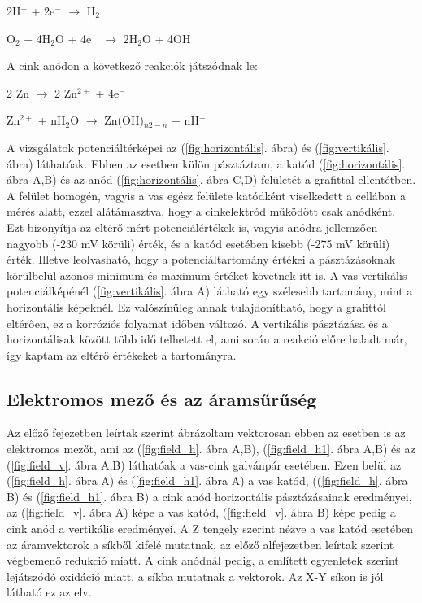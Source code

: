 2H$^+$ + 2e$^-$ $\longrightarrow$ H$_2$

O$_2$ + 4H$_2$O + 4e$^-$ $\longrightarrow$ 2H$_2$O + 4OH$^-$

A cink anódon a következő reakciók játszódnak le:

2 Zn $\longrightarrow$ 2 Zn$^{2+}$ + 4e$^-$ 

Zn$^{2+}$ + nH$_2$O $\longrightarrow$ Zn(OH)$_{n2-n}$ + nH$^+$

A vizsgálatok potenciáltérképei az (\ref{fig:horizontális}. ábra) és (\ref{fig:vertikális}. ábra) láthatóak. Ebben az esetben külön pásztáztam, a katód (\ref{fig:horizontális}. ábra A,B) és az anód (\ref{fig:horizontális}. ábra C,D) felületét a grafittal ellentétben. A felület homogén, vagyis a vas egész felülete katódként viselkedett a cellában a mérés alatt, ezzel alátámasztva, hogy a cinkelektród működött csak anódként. Ezt bizonyítja az eltérő mért potenciálértékek is, vagyis anódra jellemzően nagyobb (-230 mV körüli) érték, és a katód esetében kisebb (-275 mV körüli) érték. Illetve leolvasható, hogy a potenciáltartomány értékei a pásztázásoknak körülbelül azonos minimum és maximum értéket követnek itt is. A vas vertikális potenciálképénél (\ref{fig:vertikális}. ábra A) látható egy szélesebb tartomány, mint a horizontális képeknél. Ez valószínűleg annak tulajdonítható, hogy a grafittól eltérően, ez a korróziós folyamat időben változó. A vertikális pásztázása és a horizontálisak között több idő telhetett el, ami során a reakció előre haladt már, így kaptam az eltérő értékeket a tartományra. 

\subsection{Elektromos mező és az áramsűrűség}

Az előző fejezetben leírtak szerint ábrázoltam vektorosan ebben az esetben is az elektromos mezőt, ami az (\ref{fig:field_h}. ábra A,B), (\ref{fig:field_h1}. ábra A,B) és az (\ref{fig:field_v}. ábra A,B) láthatóak a vas-cink galvánpár esetében. Ezen belül az (\ref{fig:field_h}. ábra A) és (\ref{fig:field_h1}. ábra A) a vas katód, ((\ref{fig:field_h}. ábra B) és (\ref{fig:field_h1}. ábra B) a cink anód horizontális pásztázásainak eredményei, az (\ref{fig:field_v}. ábra A) képe a vas katód, (\ref{fig:field_v}. ábra B) képe pedig a cink anód a vertikális eredményei. A Z tengely szerint nézve a vas katód esetében az áramvektorok a síkből kifelé mutatnak, az előző alfejezetben leírtak szerint végbemenő redukció miatt. A cink anódnál pedig, a említett egyenletek szerint lejátszódó oxidáció miatt, a síkba mutatnak a vektorok. Az X-Y síkon is jól látható ez az elv.

